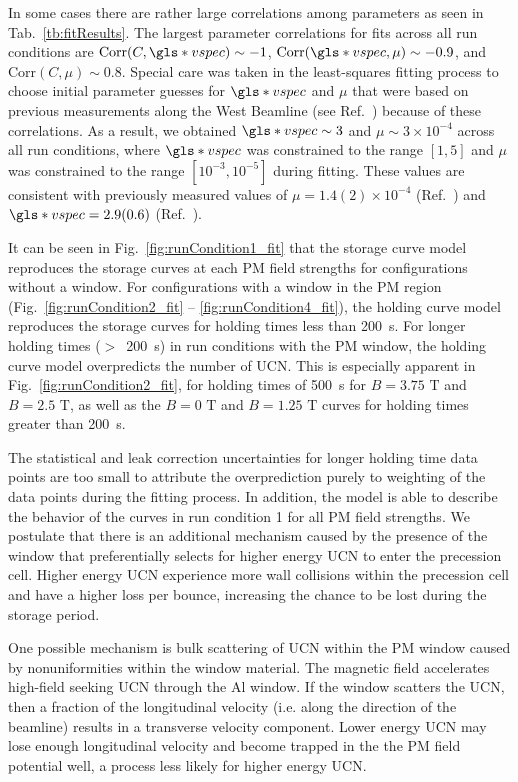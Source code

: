 In some cases there are rather large correlations among parameters as seen in Tab.~\ref{tb:fitResults}. The largest parameter correlations for fits across all run conditions are  $\text{Corr}(C,\gls*{vspec}) \sim -1$, $\text{Corr}(\gls*{vspec},\mu) \sim -0.9$, and $\text{Corr}(C,\mu) \sim 0.8$. Special care was taken in the least-squares fitting process to choose initial parameter guesses for $\gls*{vspec}$ and $\mu$ that were based on previous measurements along the West Beamline (see Ref.~\cite{ito_performance_2018, pattie_jr_evaluation_2017}) because of these correlations. As a result, we obtained $\gls*{vspec} \sim 3$ and $\mu \sim 3\times 10^{-4}$ across all run conditions, where $\gls*{vspec}$ was constrained to the range $[1,5]$ and $\mu$ was constrained to the range $[10^{-3}, 10^{-5}]$ during fitting. These values are consistent with previously measured values of $\mu = 1.4(2)\times 10^{-4}$ (Ref.~\cite{pattie_jr_evaluation_2017}) and $\gls*{vspec} = 2.9(0.6)$ (Ref.~\cite{ito_performance_2018}).

It can be seen in Fig.~\ref{fig:runCondition1_fit} that the storage curve model reproduces the storage curves at each PM field strengths for configurations without a window. For configurations with a window in the PM region (Fig.~\ref{fig:runCondition2_fit} -- \ref{fig:runCondition4_fit}), the holding curve model reproduces the storage curves for holding times less than \qty{200}{\s}. For longer holding times ($>$~\qty{200}{\s}) in run conditions with the PM window, the holding curve model overpredicts the number of UCN. This is especially apparent in Fig.~\ref{fig:runCondition2_fit}, for holding times of \qty{500}{\s} for $B=3.75\text{ T}$ and $B=2.5\text{ T}$, as well as the $B=0\text{ T}$ and $B=1.25\text{ T}$ curves for holding times greater than \qty{200}{\s}. 

The statistical and leak correction uncertainties for longer holding time data points are too small to attribute the overprediction purely to weighting of the data points during the fitting process. In addition, the model is able to describe the behavior of the curves in run condition 1 for all PM field strengths.  We postulate that there is an additional mechanism caused by the presence of the window that preferentially selects for higher energy UCN to enter the precession cell. Higher energy UCN experience more wall collisions within the precession cell and have a higher loss per bounce, increasing the chance to be lost during the storage period.

One possible mechanism is bulk scattering of UCN within the PM window caused by nonuniformities within the window material. The magnetic field accelerates high-field seeking UCN through the Al window. If the window scatters the UCN, then a fraction of the longitudinal velocity (i.e. along the direction of the beamline) results in a transverse velocity component. Lower energy UCN may lose enough longitudinal velocity and become trapped in the the PM field potential well, a process less likely for higher energy UCN.

